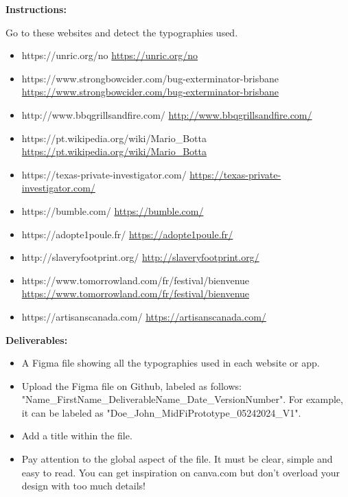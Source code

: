 \makeheaderfiles

\textbf{Instructions:}

Go to these websites and detect the typographies used.

\begin{itemize}
\item https://unric.org/no \url{https://unric.org/no}
\item https://www.strongbowcider.com/bug-exterminator-brisbane \url{https://www.strongbowcider.com/bug-exterminator-brisbane}
\item http://www.bbqgrillsandfire.com/ \url{http://www.bbqgrillsandfire.com/}
\item https://pt.wikipedia.org/wiki/Mario\_Botta \url{https://pt.wikipedia.org/wiki/Mario_Botta}
\item https://texas-private-investigator.com/ \url{https://texas-private-investigator.com/}
\item https://bumble.com/ \url{https://bumble.com/}
\item https://adopte1poule.fr/ \url{https://adopte1poule.fr/}
\item http://slaveryfootprint.org/ \url{http://slaveryfootprint.org/}
\item https://www.tomorrowland.com/fr/festival/bienvenue \url{https://www.tomorrowland.com/fr/festival/bienvenue}
\item https://artisanscanada.com/ \url{https://artisanscanada.com/}
\end{itemize}

\textbf{Deliverables:}

\begin{itemize}
\item A Figma file showing all the typographies used in each website or app.
\item Upload the Figma file on Github, labeled as follows: "Name\_FirstName\_DeliverableName\_Date\_VersionNumber". For example, it can be labeled as "Doe\_John\_MidFiPrototype\_05242024\_V1".
\item Add a title within the file.
\item Pay attention to the global aspect of the file. It must be clear, simple and easy to read. You can get inspiration on canva.com but don't overload your design with too much details!
\end{itemize}

